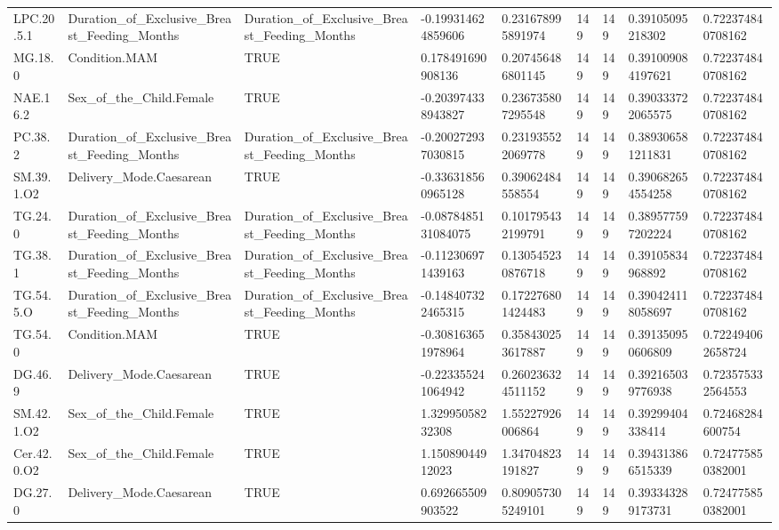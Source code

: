 \begin{longtable}{lllllllll}
LPC.20.5.1 & Duration\_of\_Exclusive\_Breast\_Feeding\_Months & Duration\_of\_Exclusive\_Breast\_Feeding\_Months & -0.199314624859606 & 0.231678995891974 & 149 & 149 & 0.39105095218302 & 0.722374840708162 \\
MG.18.0 & Condition.MAM & TRUE & 0.178491690908136 & 0.207456486801145 & 149 & 149 & 0.391009084197621 & 0.722374840708162 \\
NAE.16.2 & Sex\_of\_the\_Child.Female & TRUE & -0.203974338943827 & 0.236735807295548 & 149 & 149 & 0.390333722065575 & 0.722374840708162 \\
PC.38.2 & Duration\_of\_Exclusive\_Breast\_Feeding\_Months & Duration\_of\_Exclusive\_Breast\_Feeding\_Months & -0.200272937030815 & 0.231935522069778 & 149 & 149 & 0.389306581211831 & 0.722374840708162 \\
SM.39.1.O2 & Delivery\_Mode.Caesarean & TRUE & -0.336318560965128 & 0.39062484558554 & 149 & 149 & 0.390682654554258 & 0.722374840708162 \\
TG.24.0 & Duration\_of\_Exclusive\_Breast\_Feeding\_Months & Duration\_of\_Exclusive\_Breast\_Feeding\_Months & -0.0878485131084075 & 0.101795432199791 & 149 & 149 & 0.389577597202224 & 0.722374840708162 \\
TG.38.1 & Duration\_of\_Exclusive\_Breast\_Feeding\_Months & Duration\_of\_Exclusive\_Breast\_Feeding\_Months & -0.112306971439163 & 0.130545230876718 & 149 & 149 & 0.39105834968892 & 0.722374840708162 \\
TG.54.5.O & Duration\_of\_Exclusive\_Breast\_Feeding\_Months & Duration\_of\_Exclusive\_Breast\_Feeding\_Months & -0.148407322465315 & 0.172276801424483 & 149 & 149 & 0.390424118058697 & 0.722374840708162 \\
TG.54.0 & Condition.MAM & TRUE & -0.308163651978964 & 0.358430253617887 & 149 & 149 & 0.391350950606809 & 0.722494062658724 \\
DG.46.9 & Delivery\_Mode.Caesarean & TRUE & -0.223355241064942 & 0.260236324511152 & 149 & 149 & 0.392165039776938 & 0.723575332564553 \\
SM.42.1.O2 & Sex\_of\_the\_Child.Female & TRUE & 1.32995058232308 & 1.55227926006864 & 149 & 149 & 0.39299404338414 & 0.72468284600754 \\
Cer.42.0.O2 & Sex\_of\_the\_Child.Female & TRUE & 1.15089044912023 & 1.34704823191827 & 149 & 149 & 0.394313866515339 & 0.724775850382001 \\
DG.27.0 & Delivery\_Mode.Caesarean & TRUE & 0.692665509903522 & 0.809057305249101 & 149 & 149 & 0.393343289173731 & 0.724775850382001 \\

\end{longtable}
